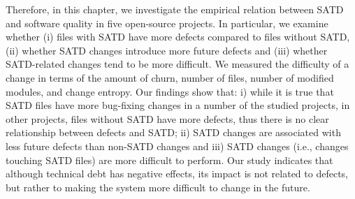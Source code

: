 Therefore, in this chapter, we investigate the empirical relation between SATD and software quality in five open-source projects. In particular, we examine whether (i) files with SATD have more defects compared to files without SATD, (ii) whether SATD changes introduce more future defects and (iii) whether SATD-related changes tend to be more difficult. We measured the difficulty of a change in terms of the amount of churn, number of files, number of modified modules, and change entropy. Our findings show that: i) while it is true that SATD files have more bug-fixing changes in a number of the studied projects, in other projects, files without SATD have more defects, thus there is no clear relationship between defects and SATD; ii) SATD changes are associated with less future defects than non-SATD changes and iii) SATD changes (i.e., changes touching SATD files) are more difficult to perform. Our study indicates that although technical debt has negative effects, its impact is not related to defects, but rather to making the system more difficult to change in the future.




